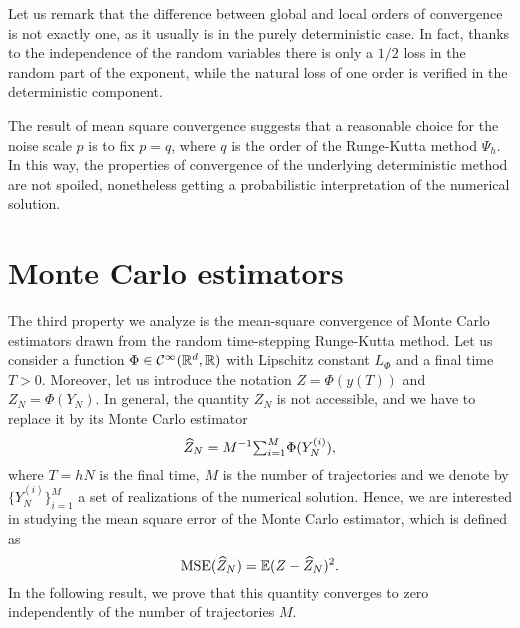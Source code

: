 \documentclass[10pt]{article}
\begin{document}
\begin{remark} Let us remark that the difference between global and local orders of convergence is not exactly one, as it usually is in the purely deterministic case. In fact, thanks to the independence of the random variables there is only a $1/2$ loss in the random part of the exponent, while the natural loss of one order is verified in the deterministic component.
\end{remark}
\begin{remark} The result of mean square convergence suggests that a reasonable choice for the noise scale $p$ is to fix $p=q$, where $q$ is the order of the Runge-Kutta method $\Psi_h$. In this way, the properties of convergence of the underlying deterministic method are not spoiled, nonetheless getting a probabilistic interpretation of the numerical solution.
\end{remark}


\section{Monte Carlo estimators}\label{sec:MonteCarlo}

The third property we analyze is the mean-square convergence of Monte Carlo estimators drawn from the random time-stepping Runge-Kutta method. Let us consider a function $\Phi\in\mathcal{C}^\infty(\mathbb{R}^d, \mathbb{R})$ with Lipschitz constant $L_\Phi$ and a final time $T > 0$. Moreover, let us introduce the notation $Z = \Phi(y(T))$ and $Z_N = \Phi(Y_N)$. In general, the quantity $Z_N$ is not accessible, and we have to replace it by its Monte Carlo estimator 
\begin{equation}\label{eq:MSE}
	\widehat Z_N = M^{-1} {\textstyle\sum}_{i = 1}^M \Phi(Y_N^{(i)}),
\end{equation}
where $T = hN$ is the final time, $M$ is the number of trajectories and we denote by $\{Y_N^{(i)}\}_{i=1}^M$ a set of realizations of the numerical solution. Hence, we are interested in studying the mean square error of the Monte Carlo estimator, which is defined as
\begin{equation}
	\operatorname{MSE}(\widehat Z_N) = \operatorname{\mathbb{E}}(Z - \widehat Z_N)^2.
\end{equation}
In the following result, we prove that this quantity converges to zero independently of the number of trajectories $M$.
\end{document}
